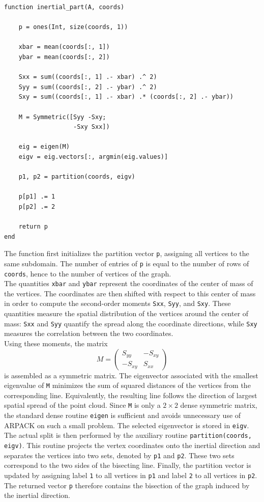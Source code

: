 \documentclass[unicode,10pt,a4paper,oneside,numbers=endperiod,openany]{scrartcl}
\begin{document}
\begin{lstlisting}[style=grayverbatim, caption={Inertial Bisection algorithm}, label={lst:inertial_bisection}]
function inertial_part(A, coords)

    p = ones(Int, size(coords, 1))

    xbar = mean(coords[:, 1])
    ybar = mean(coords[:, 2])

    Sxx = sum((coords[:, 1] .- xbar) .^ 2)
    Syy = sum((coords[:, 2] .- ybar) .^ 2)
    Sxy = sum((coords[:, 1] .- xbar) .* (coords[:, 2] .- ybar))

    M = Symmetric([Syy -Sxy;
                   -Sxy Sxx])

    eig = eigen(M)
    eigv = eig.vectors[:, argmin(eig.values)]

    p1, p2 = partition(coords, eigv)

    p[p1] .= 1
    p[p2] .= 2

    return p
end
\end{lstlisting}
The function first initializes the partition vector \texttt{p}, assigning all vertices to the same
subdomain. The number of entries of \texttt{p} is equal to the number of rows of \texttt{coords}, hence to the number of vertices of the graph. \\
The quantities \texttt{xbar} and \texttt{ybar} represent the coordinates of the center of mass of the vertices. The coordinates are then shifted with respect to this center of mass in order to compute the second-order moments \texttt{Sxx}, \texttt{Syy}, and \texttt{Sxy}. These quantities measure the spatial distribution of the vertices around the center of mass: \texttt{Sxx} and \texttt{Syy} quantify the spread along the coordinate directions, while \texttt{Sxy} measures the correlation between the two coordinates.\\

Using these moments, the matrix
\[
M =
\begin{pmatrix}
S_{yy} & -S_{xy} \\
-S_{xy} & S_{xx}
\end{pmatrix}
\]
is assembled as a symmetric matrix. The eigenvector associated with the smallest eigenvalue of
\texttt{M} minimizes the sum of squared distances of the vertices from the corresponding line. Equivalently,
the resulting line follows the direction of largest spatial spread of the point cloud. Since \texttt{M} is only
a \(2\times 2\) dense symmetric matrix, the standard dense routine \texttt{eigen} is sufficient and avoids
unnecessary use of ARPACK on such a small problem. The selected eigenvector is stored in \texttt{eigv}.\\
The actual split is then performed by the auxiliary routine \texttt{partition(coords, eigv)}. This
routine projects the vertex coordinates onto the inertial direction and separates the vertices into
two sets, denoted by \texttt{p1} and \texttt{p2}. These two sets correspond to the two sides of the
bisecting line. Finally, the partition vector is updated by assigning label \texttt{1} to all vertices in
\texttt{p1} and label \texttt{2} to all vertices in \texttt{p2}. The returned vector \texttt{p} therefore contains
the bisection of the graph induced by the inertial direction.
\end{document}
